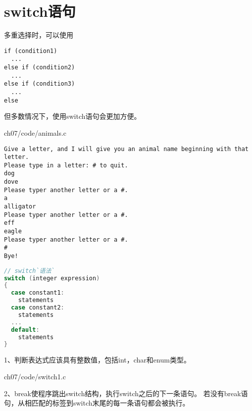 \section{switch语句}
\begin{frame}[fragile]\ft{\secname}
多重选择时，可以使用
\begin{lstlisting}
if (condition1)
  ...
else if (condition2)
  ...
else if (condition3)
  ...
else    
\end{lstlisting}
但多数情况下，使用switch语句会更加方便。
\end{frame}

\begin{frame}\ft{\secname}

{ch07/code/animals.c}
\end{frame}


\begin{frame}[fragile]\ft{\secname}
\begin{lstlisting}
Give a letter, and I will give you an animal name beginning with that letter.
Please type in a letter: # to quit.
dog
dove
Please typer another letter or a #.
a
alligator
Please typer another letter or a #.
eff
eagle
Please typer another letter or a #.
#
Bye!
\end{lstlisting}
\end{frame}

\begin{frame}[fragile]\ft{\secname}
\begin{lstlisting}[language=c,frame=single]
// switch`语法`
switch (integer expression)
{
  case constant1:
    statements
  case constant2:
    statements
  ...
  default:
    statements
}    
\end{lstlisting}
\end{frame}

\begin{frame}[fragile]\ft{\secname}
  1、判断表达式应该具有整数值，包括int，char和enum类型。
\end{frame}

\begin{frame}[fragile]\ft{\secname}
  
  {ch07/code/switch1.c}
\end{frame}

\begin{frame}[fragile]\ft{\secname}
2、break使程序跳出switch结构，执行switch之后的下一条语句。
若没有break语句，从相匹配的标签到switch末尾的每一条语句都会被执行。
\end{frame}

